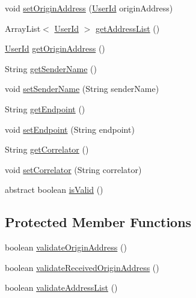 \begin{DoxyCompactItemize}
void \hyperlink{classcom_1_1bluevia_1_1messagery_1_1data_1_1AbstractMessage_af4faeaeb18693a3e493db36a410e858f}{setOriginAddress} (\hyperlink{classcom_1_1bluevia_1_1commons_1_1data_1_1UserId}{UserId} originAddress)
\item 
ArrayList$<$ \hyperlink{classcom_1_1bluevia_1_1commons_1_1data_1_1UserId}{UserId} $>$ \hyperlink{classcom_1_1bluevia_1_1messagery_1_1data_1_1AbstractMessage_a9a2222b7e241c88a1c1e97e2f97d9dd6}{getAddressList} ()
\item 
\hyperlink{classcom_1_1bluevia_1_1commons_1_1data_1_1UserId}{UserId} \hyperlink{classcom_1_1bluevia_1_1messagery_1_1data_1_1AbstractMessage_a8a61594a470cd37c09ed7a7338bdaba6}{getOriginAddress} ()
\item 
String \hyperlink{classcom_1_1bluevia_1_1messagery_1_1data_1_1AbstractMessage_aff7e290c0156638cef389e91e9e0c48e}{getSenderName} ()
\item 
void \hyperlink{classcom_1_1bluevia_1_1messagery_1_1data_1_1AbstractMessage_a9e3e273703847b15215dd05a8408d3f3}{setSenderName} (String senderName)
\item 
String \hyperlink{classcom_1_1bluevia_1_1messagery_1_1data_1_1AbstractMessage_a7b941130c6a9d8f14829b6a0df330836}{getEndpoint} ()
\item 
void \hyperlink{classcom_1_1bluevia_1_1messagery_1_1data_1_1AbstractMessage_a7c155b001fd9cd24f79f99bed7e9b9ef}{setEndpoint} (String endpoint)
\item 
String \hyperlink{classcom_1_1bluevia_1_1messagery_1_1data_1_1AbstractMessage_a7574b981b037c3a33888dd305663c6b9}{getCorrelator} ()
\item 
void \hyperlink{classcom_1_1bluevia_1_1messagery_1_1data_1_1AbstractMessage_a29653e45e258735ab83311a0077c8755}{setCorrelator} (String correlator)
\item 
abstract boolean \hyperlink{classcom_1_1bluevia_1_1messagery_1_1data_1_1AbstractMessage_ad5a798b37381c48c1653200114a70c85}{isValid} ()
\end{DoxyCompactItemize}
\subsection*{Protected Member Functions}
\begin{DoxyCompactItemize}
\item 
boolean \hyperlink{classcom_1_1bluevia_1_1messagery_1_1data_1_1AbstractMessage_aa51463cf7df5be4f94c427f899d13a7b}{validateOriginAddress} ()
\item 
boolean \hyperlink{classcom_1_1bluevia_1_1messagery_1_1data_1_1AbstractMessage_ada3913e7bb6fc59e1179916a2decfd3a}{validateReceivedOriginAddress} ()
\item 
boolean \hyperlink{classcom_1_1bluevia_1_1messagery_1_1data_1_1AbstractMessage_a9b6fcb706957798bd9408d26df5dc8fb}{validateAddressList} ()
\end{DoxyCompactItemize}


